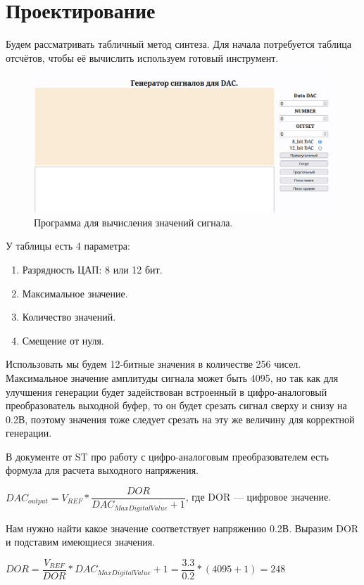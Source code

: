 \chapter{Проектирование}
Будем рассматривать табличный метод синтеза. Для начала потребуется таблица отсчётов, чтобы её вычислить используем готовый инструмент.
	
	\begin{figure}[H]
    \centering
    \includegraphics[width=1\textwidth]{../image/lut_prog.png}
    \caption{Программа для вычисления значений сигнала.}
	\end{figure}
	
	У таблицы есть 4 параметра:
	\begin{enumerate}
		\item Разрядность ЦАП: 8 или 12 бит.
		\item Максимальное значение.
		\item Количество значений.
		\item Смещение от нуля.
	\end{enumerate}
	
	Использовать мы будем 12-битные значения в количестве 256 чисел. Максимальное значение амплитуды сигнала может быть 4095, но так как для улучшения генерации будет задействован встроенный в цифро-аналоговый преобразователь выходной буфер, то он будет срезать сигнал сверху и снизу на 0.2В, поэтому значения тоже следует срезать на эту же величину для корректной генерации.
	
	В документе от ST про работу с цифро-аналоговым преобразователем есть формула для расчета выходного напряжения.
	
	$DAC_{output} = V_{REF}*\dfrac{DOR}{DAC_{MaxDigitalValue} + 1}$, где DOR --- цифровое значение.
	
	Нам нужно найти какое значение соответствует напряжению 0.2В. Выразим DOR и подставим имеющиеся значения.
	
	$DOR = \dfrac{V_{REF}}{DOR}*DAC_{MaxDigitalValue} + 1 = \dfrac{3.3}{0.2}*(4095+1) = 248$
	
